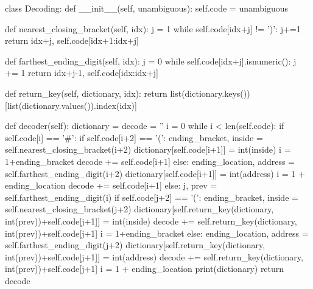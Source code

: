 \documentclass[scrartcl]{article}
\begin{document}
\begin{python}
    class Decoding:
        def __init__(self, unambiguous):
            self.code = unambiguous 
        
        def nearest_closing_bracket(self, idx):
            j = 1
            while self.code[idx+j] != ')':
                j+=1
            return idx+j, self.code[idx+1:idx+j]
        
        def farthest_ending_digit(self, idx):
            j = 0
            while self.code[idx+j].isnumeric():
                j += 1
            return idx+j-1, self.code[idx:idx+j]
        
        def return_key(self, dictionary, idx):
            return list(dictionary.keys())[list(dictionary.values()).index(idx)]
        
        def decoder(self):
        dictionary = {}
            decode = ''
            i = 0
            while i < len(self.code):
                if self.code[i] == '#':
                    if self.code[i+2] == '(': 
                        ending_bracket, inside = self.nearest_closing_bracket(i+2)
                        dictionary[self.code[i+1]] = int(inside)
                        i = 1+ending_bracket
                        decode += self.code[i+1]
                    else:
                        ending_location, address = self.farthest_ending_digit(i+2)
                        dictionary[self.code[i+1]] = int(address)
                        i = 1 + ending_location
                        decode += self.code[i+1]
                else:
                    j, prev = self.farthest_ending_digit(i)
                    if self.code[j+2] == '(':
                        ending_bracket, inside = self.nearest_closing_bracket(j+2)
                        dictionary[self.return_key(dictionary, int(prev))+self.code[j+1]] = int(inside)
                        decode += self.return_key(dictionary, int(prev))+self.code[j+1]
                        i = 1+ending_bracket
                    else:
                        ending_location, address = self.farthest_ending_digit(j+2)
                        dictionary[self.return_key(dictionary, int(prev))+self.code[j+1]] = int(address)
                        decode += self.return_key(dictionary, int(prev))+self.code[j+1]
                        i = 1 + ending_location
            print(dictionary)
            return decode    
\end{python}
\end{document}
